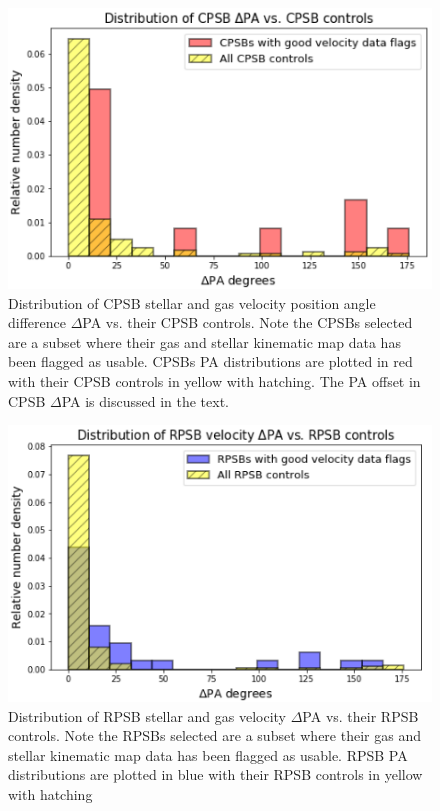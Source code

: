 \begin{figure}
    \centering
    \includegraphics[width=\columnwidth]{images/JupyterPlots/DIST-DPA-CPSB+FLAGS+controls.png}
    \caption{Distribution of CPSB stellar and gas velocity position angle difference $\Delta$PA vs. their CPSB controls. Note the CPSBs selected are a subset where their gas and stellar kinematic map data has been flagged as usable. CPSBs PA distributions are plotted in red with their CPSB controls in yellow with hatching. The PA offset in CPSB $\Delta$PA is discussed in the text.}
    \label{fig:CPSBvsControlDeltaPAs}
\end{figure}

\begin{figure}
    \centering
    \includegraphics[width=\columnwidth]{images/JupyterPlots/DIST-Good-RPSB+Flags+Controls.png}
    \caption{Distribution of RPSB stellar and gas velocity $\Delta$PA vs. their RPSB controls. Note the RPSBs selected are a subset where their gas and stellar kinematic map data has been flagged as usable. RPSB PA distributions are plotted in blue with their RPSB controls in yellow with hatching}
    \label{fig:RPSBvsControlDeltaPAs}
\end{figure}


